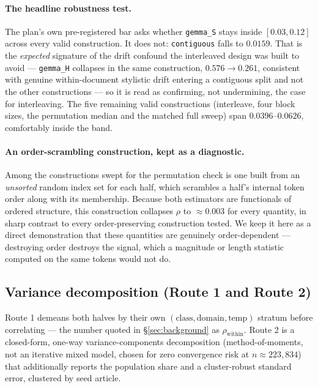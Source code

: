 \documentclass{article}
\begin{document}
\paragraph{The headline robustness test.} The plan's own pre-registered bar
asks whether \texttt{gemma\_S} stays inside $[0.03,0.12]$ across every valid
construction. It does not: \texttt{contiguous} falls to $0.0159$. That is the
\emph{expected} signature of the drift confound the interleaved design was
built to avoid --- \texttt{gemma\_H} collapses in the same construction,
$0.576\to0.261$, consistent with genuine within-document stylistic drift
entering a contiguous split and not the other constructions --- so it is read
as confirming, not undermining, the case for interleaving. The five
remaining valid constructions (interleave, four block sizes, the permutation
median and the matched full sweep) span $0.0396$--$0.0626$, comfortably inside
the band.

\paragraph{An order-scrambling construction, kept as a diagnostic.} Among the
constructions swept for the permutation check is one built from an
\emph{unsorted} random index set for each half, which scrambles a half's
internal token order along with its membership. Because both estimators are
functionals of ordered structure, this construction collapses $\rho$ to
$\approx\!0.003$ for every quantity, in sharp contrast to every order-preserving
construction tested. We keep it here as a direct demonstration that these
quantities are genuinely order-dependent --- destroying order destroys the
signal, which a magnitude or length statistic computed on the same tokens
would not do.

\subsection{Variance decomposition (Route 1 and Route 2)}
\label{app:variancecomponents}

Route 1 demeans both halves by their own $(\text{class},\text{domain},\text{temp})$
stratum before correlating --- the number quoted in \S\ref{sec:background} as
$\rho_{\text{within}}$. Route 2 is a closed-form, one-way variance-components
decomposition (method-of-moments, not an iterative mixed model, chosen for zero
convergence risk at $n\!\approx\!223{,}834$) that additionally reports the
population share and a cluster-robust standard error, clustered by seed
article.
\end{document}

